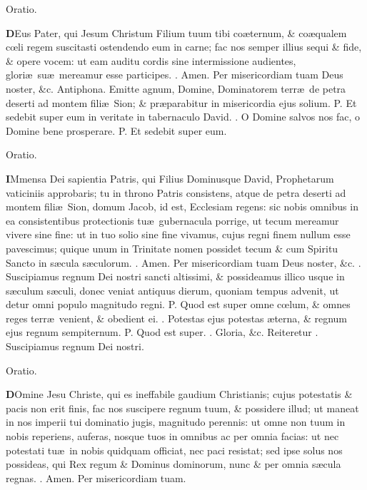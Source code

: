 \documentclass[letter,11pt]{book}
\makeatletter
\DeclareRobustCommand{\Vbar}{\vers@resp{-0.1em}{V}}
\DeclareRobustCommand{\Rbar}{\vers@resp{0pt}{R}}
\newcommand{\vers@resp@sym}{\raisebox{0.2ex}{\rotatebox[origin=c]{-20}{$\m@th\rceil$}}}
\newcommand{\vers@resp}[2]{%
  {\ooalign{\hidewidth\kern#1\vers@resp@sym\hidewidth\cr#2\cr}}%
}%
\def\P{\color{Red} P. \color{black}}
\def\V{\color{Red} \Vbar . \color{black}}
\def\R{\color{Red} \Rbar . \color{black}}
\makeatother
\begin{document}
\begin{multicols*}{2}
\vspace{-.5em} \begin{center} \color{Red} Oratio. \color{black} \end{center} \vspace{-.5em}
\lettrine[lines=2]{\bfseries \color{Red} D}{}Eus Pater, qui Jesum Christum Filium tuum tibi co\ae ternum, \& co\ae qualem c\oe li regem suscitasti ostendendo eum in carne; fac nos semper illius sequi \& fide, \& opere vocem: ut eam auditu cordis sine intermissione audientes, glori\ae \ su\ae \ mereamur esse participes. \R Amen. Per misericordiam tuam Deus noster, \&c.
\newline \color{Red} Antiphona. \color{black} Emitte agnum, Domine, Dominatorem terr\ae \ de petra deserti ad montem fili\ae \ Sion; \& pr\ae parabitur in misericordia
ejus solium. \P Et sedebit super eum in veritate in tabernaculo David. \V O Domine salvos nos fac, o Domine bene prosperare. \P Et sedebit super eum.
\vspace{-.5em} \begin{center} \color{Red} Oratio. \color{black} \end{center} \vspace{-.5em}
\lettrine[lines=2]{\bfseries \color{Red} I}{}Mmensa Dei sapientia Patris, qui Filius Dominusque David, Prophetarum vaticiniis approbaris; tu in throno Patris consistens, atque de petra deserti ad montem fili\ae \ Sion, domum Jacob, id est, Ecclesiam regens: sic nobis omnibus in ea consistentibus protectionis tu\ae \ gubernacula porrige, ut tecum mereamur vivere sine fine: ut in tuo solio sine fine vivamus, cujus regni finem nullum esse pavescimus; quique unum in Trinitate nomen possidet tecum \& cum Spiritu Sancto in s\ae cula s\ae culorum. \R Amen. Per misericordiam tuam Deus noster, \&c.
\newline \R Suscipiamus regnum Dei nostri sancti altissimi, \& possideamus illico usque in s\ae culum s\ae culi, donec veniat antiquus dierum, quoniam tempus advenit, ut detur omni populo magnitudo regni. \P Quod est super omne c\oe lum, \& omnes reges terr\ae \ venient, \& obedient ei. \V Potestas ejus potestas \ae terna, \& regnum ejus regnum sempiternum. \P Quod est super. \V Gloria, \&c. \color{Red} Reiteretur \color{black} \R Suscipiamus regnum Dei nostri.
\vspace{-.5em} \begin{center} \color{Red} Oratio. \color{black} \end{center} \vspace{-.5em}
\lettrine[lines=2]{\bfseries \color{Red} D}{}Omine Jesu Christe, qui es ineffabile gaudium Christianis; cujus potestatis \& pacis non erit finis, fac nos suscipere regnum tuum, \& possidere illud; ut maneat in nos imperii tui dominatio jugis, magnitudo perennis: ut omne non tuum in nobis reperiens, auferas, nosque tuos in omnibus ac per omnia facias: ut nec potestati tu\ae \ in nobis quidquam officiat, nec paci resistat; sed ipse solus nos possideas, qui Rex regum \& Dominus dominorum, nunc \& per omnia s\ae cula regnas. \R Amen. Per misericordiam tuam.

\end{multicols*}
\end{document}
